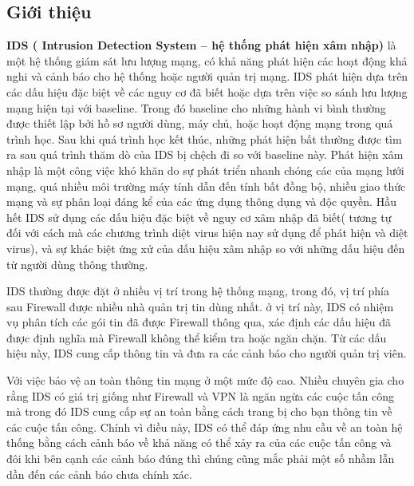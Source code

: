 \subsection{Giới thiệu}
\textbf{IDS ( Intrusion Detection System – hệ thống phát hiện xâm nhập)} là một hệ thống giám sát lưu lượng mạng, có khả năng phát hiện các hoạt động khả nghi và cảnh báo cho hệ thống hoặc người quản trị mạng.
IDS phát hiện dựa trên các dấu hiệu đặc biệt về các nguy cơ đã biết hoặc dựa trên việc so sánh lưu lượng mạng hiện tại với baseline.
Trong đó baseline cho những hành vi bình thường được thiết lập bởi hồ sơ người dùng, máy chủ, hoặc hoạt động mạng trong quá trình học.
Sau khi quá trình học kết thúc, những phát hiện bất thường được tìm ra sau quá trình thăm dò của IDS bị chệch đi so với baseline này.
Phát hiện xâm nhập là một công việc khó khăn do sự phát triển nhanh chóng các của mạng lưới mạng, quá nhiều môi trường máy tính dẫn đến tính bất đồng bộ, nhiều giao thức mạng và sự phân loại đáng kể của các ứng dụng thông dụng và độc quyền. 
Hầu hết IDS sử dụng các dấu hiệu đặc biệt về nguy cơ xâm nhập đã biết( tương tự đối với cách mà các chương trình diệt virus hiện nay sử dụng để phát hiện và diệt virus), và sự khác biệt ứng xử của dấu hiệu xâm nhập so với những dấu hiệu đến từ người dùng thông thường.
\par
IDS thường được đặt ở nhiều vị trí trong hệ thống mạng, trong đó, vị trí phía sau Firewall được nhiều nhà quản trị tin dùng nhất. ở vị trí này, IDS có nhiệm vụ phân tích các gói tin đã được Firewall thông qua, xác định các dấu hiệu đã được định nghĩa mà Firewall không thể kiểm tra hoặc ngăn chặn. Từ các dấu hiệu này, IDS cung cấp thông tin và đưa ra các cảnh báo cho người quản trị viên.
\par
Với việc bảo vệ an toàn thông tin mạng ở một mức độ cao. 
Nhiều chuyên gia cho rằng IDS có giá trị giống như Firewall và VPN là ngăn ngừa các cuộc tấn công mà trong đó IDS cung cấp sự an toàn bằng cách trang bị cho bạn thông tin về các cuộc tấn công.
Chính vì điều này, IDS có thể đáp ứng nhu cầu về an toàn hệ thống bằng cách cảnh báo về khả năng có thể xảy ra của các cuộc tấn công và đôi khi bên cạnh các cảnh báo đúng thì chúng cũng mắc phải một số nhầm lẫn dần đến các cảnh báo chưa chính xác.

